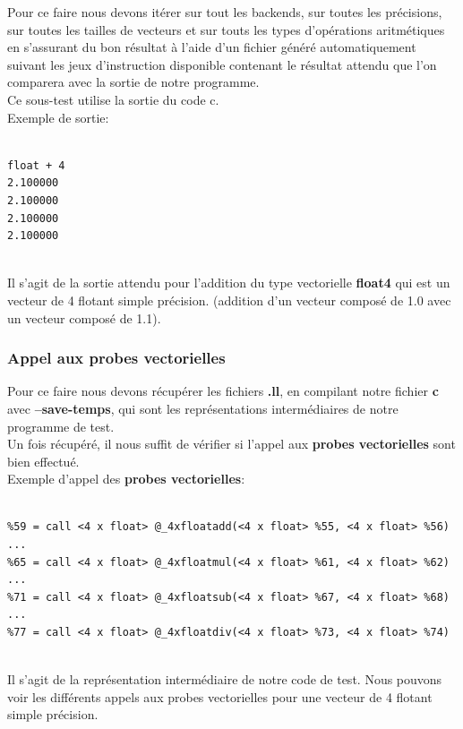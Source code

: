 \documentclass[11pt]{article}
\begin{document}
Pour ce faire nous devons itérer sur tout les backends, sur toutes les
précisions, sur toutes les tailles de vecteurs et sur touts les types
d'opérations aritmétiques en s'assurant du bon résultat à l'aide
d'un fichier généré automatiquement suivant les jeux d'instruction
disponible contenant le résultat attendu que l'on comparera avec
la sortie de notre programme.
\\ \vspace{5mm}
Ce sous-test utilise la sortie du code c.
\\ \vspace{5mm}
Exemple de sortie:
\\ \vspace{5mm}
\begin{verbatim}

float + 4
2.100000
2.100000
2.100000
2.100000

\end{verbatim}
\\ \vspace{5mm}
Il s'agit de la sortie attendu pour l'addition du type vectorielle \textbf{float4} qui
est un vecteur de 4 flotant simple précision. (addition d'un vecteur
composé de 1.0 avec un vecteur composé de 1.1).

\subsubsection{Appel aux probes vectorielles}
\label{sec:org4424d81}

Pour ce faire nous devons récupérer les fichiers \textbf{.ll}, en
compilant notre fichier \textbf{c} avec \textbf{--save-temps}, qui sont les
représentations intermédiaires de notre programme de test.
\\ \vspace{5mm}
Un fois récupéré, il nous suffit de vérifier si l'appel aux
\textbf{probes vectorielles} sont bien effectué.
\\ \vspace{5mm}
Exemple d'appel des \textbf{probes vectorielles}:
\\ \vspace{5mm}
\begin{verbatim}

%59 = call <4 x float> @_4xfloatadd(<4 x float> %55, <4 x float> %56)
...
%65 = call <4 x float> @_4xfloatmul(<4 x float> %61, <4 x float> %62)
...
%71 = call <4 x float> @_4xfloatsub(<4 x float> %67, <4 x float> %68)
...
%77 = call <4 x float> @_4xfloatdiv(<4 x float> %73, <4 x float> %74)

\end{verbatim}
\\ \vspace{5mm}
Il s'agit de la représentation intermédiaire de notre code de
test. Nous pouvons voir les différents appels aux probes
vectorielles pour une vecteur de 4 flotant simple précision.
\end{document}
